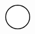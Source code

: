 \documentclass[10pt]{article}
\theoremstyle{plain}
\theoremstyle{remark}
\begin{document}
\[\begin{pgfpicture}
\begin{pgfscope}
\pgfpathlineto{\pgfqpoint{3.694223in}{1.818106in}}%
\pgfpathlineto{\pgfqpoint{3.623092in}{1.888394in}}%
\pgfpathclose%
\pgfusepath{stroke,fill}%
\end{pgfscope}%
\begin{pgfscope}%
\pgfsetbuttcap%
\pgfsetroundjoin%
\definecolor{currentfill}{rgb}{1.000000,1.000000,1.000000}%
\pgfsetfillcolor{currentfill}%
\pgfsetlinewidth{1.003750pt}%
\definecolor{currentstroke}{rgb}{0.000000,0.000000,0.000000}%
\pgfsetstrokecolor{currentstroke}%
\pgfsetdash{}{0pt}%
\pgfpathmoveto{\pgfqpoint{2.099679in}{1.907692in}}%
\pgfpathcurveto{\pgfqpoint{2.151770in}{1.907692in}}{\pgfqpoint{2.201734in}{1.928388in}}{\pgfqpoint{2.238568in}{1.965222in}}%
\pgfpathcurveto{\pgfqpoint{2.275402in}{2.002056in}}{\pgfqpoint{2.296098in}{2.052020in}}{\pgfqpoint{2.296098in}{2.104111in}}%
\pgfpathcurveto{\pgfqpoint{2.296098in}{2.156202in}}{\pgfqpoint{2.275402in}{2.206166in}}{\pgfqpoint{2.238568in}{2.243000in}}%
\pgfpathcurveto{\pgfqpoint{2.201734in}{2.279834in}}{\pgfqpoint{2.151770in}{2.300529in}}{\pgfqpoint{2.099679in}{2.300529in}}%
\pgfpathcurveto{\pgfqpoint{2.047588in}{2.300529in}}{\pgfqpoint{1.997624in}{2.279834in}}{\pgfqpoint{1.960790in}{2.243000in}}%
\pgfpathcurveto{\pgfqpoint{1.923957in}{2.206166in}}{\pgfqpoint{1.903261in}{2.156202in}}{\pgfqpoint{1.903261in}{2.104111in}}%
\pgfpathcurveto{\pgfqpoint{1.903261in}{2.052020in}}{\pgfqpoint{1.923957in}{2.002056in}}{\pgfqpoint{1.960790in}{1.965222in}}%
\pgfpathcurveto{\pgfqpoint{1.997624in}{1.928388in}}{\pgfqpoint{2.047588in}{1.907692in}}{\pgfqpoint{2.099679in}{1.907692in}}%
\pgfpathclose%
\pgfusepath{stroke,fill}%
\end{pgfscope}%
\begin{pgfscope}%
\pgfsetbuttcap%
\pgfsetroundjoin%
\definecolor{currentfill}{rgb}{1.000000,1.000000,1.000000}%
\pgfsetfillcolor{currentfill}%
\pgfsetlinewidth{1.003750pt}%
\definecolor{currentstroke}{rgb}{0.000000,0.000000,0.000000}%
\pgfsetstrokecolor{currentstroke}%
\pgfsetdash{}{0pt}%
\pgfpathmoveto{\pgfqpoint{2.121721in}{5.523077in}}%
\pgfpathcurveto{\pgfqpoint{2.173812in}{5.523077in}}{\pgfqpoint{2.223776in}{5.543773in}}{\pgfqpoint{2.260610in}{5.580607in}}%
\pgfpathcurveto{\pgfqpoint{2.297443in}{5.617440in}}{\pgfqpoint{2.318139in}{5.667405in}}{\pgfqpoint{2.318139in}{5.719495in}}%
\pgfpathcurveto{\pgfqpoint{2.318139in}{5.771586in}}{\pgfqpoint{2.297443in}{5.821551in}}{\pgfqpoint{2.260610in}{5.858384in}}%
\pgfpathcurveto{\pgfqpoint{2.223776in}{5.895218in}}{\pgfqpoint{2.173812in}{5.915914in}}{\pgfqpoint{2.121721in}{5.915914in}}%
\pgfpathcurveto{\pgfqpoint{2.069630in}{5.915914in}}{\pgfqpoint{2.019666in}{5.895218in}}{\pgfqpoint{1.982832in}{5.858384in}}%

\end{pgfscope}
\end{pgfpicture}\]
\end{document}

